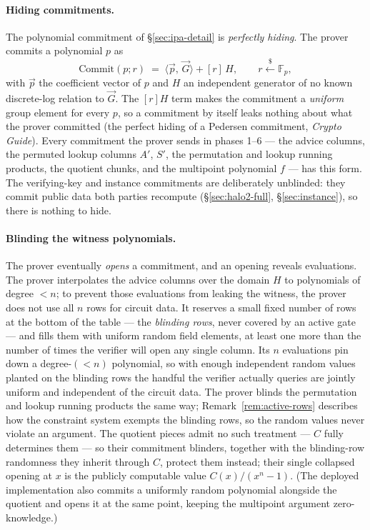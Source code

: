 \documentclass[11pt,a4paper]{article}
\theoremstyle{definition}
\newcommand{\F}{\mathbb{F}}
\newcommand{\ip}[2]{\langle #1,\, #2 \rangle}
\begin{document}
\paragraph{Hiding commitments.} The polynomial commitment of
\S\ref{sec:ipa-detail} is \emph{perfectly hiding}. The prover commits a polynomial \(p\)
as
\[
  \mathrm{Commit}(p; r) \;=\; \ip{\vec{p}}{\vec{G}} + [r]\,H, \qquad
  r \stackrel{\$}{\leftarrow} \F_p,
\]
with \(\vec p\) the coefficient vector of \(p\) and \(H\) an independent generator
of no known discrete-log relation to \(\vec G\). The \([r]H\) term makes the
commitment a \emph{uniform} group element for every \(p\), so a commitment by
itself leaks nothing about what the prover committed (the perfect hiding of a Pedersen
commitment, \emph{Crypto Guide}). Every commitment the prover sends in
phases 1--6 --- the advice columns, the permuted lookup columns $A'$, $S'$,
the permutation and lookup running products, the quotient chunks, and the
multipoint polynomial $f$ --- has this form. The verifying-key and instance
commitments are deliberately unblinded: they commit public data both parties
recompute (\S\ref{sec:halo2-full}, \S\ref{sec:instance}), so there is
nothing to hide.

\paragraph{Blinding the witness polynomials.} The prover eventually
\emph{opens} a commitment, and an opening reveals evaluations. The prover interpolates the advice columns
over the domain \(H\) to polynomials of degree \(< n\); to prevent those
evaluations from leaking the witness, the prover does not use all \(n\) rows for
circuit data. It reserves a small fixed number of rows at the bottom of the table
--- the \emph{blinding rows}, never covered by an active gate --- and fills them
with uniform random field elements, at least one more than the number of times the
verifier will open any single column. Its \(n\) evaluations pin down a degree-\((<n)\) polynomial,
so with enough independent random values planted on the
blinding rows the handful the verifier actually queries are jointly uniform and
independent of the circuit data. The prover blinds the permutation and lookup running products the same
way; Remark~\ref{rem:active-rows} describes how the constraint system
exempts the blinding rows, so the random values never violate an
argument. The quotient pieces admit no such treatment --- $C$ fully
determines them --- so their commitment blinders, together with the
blinding-row randomness they inherit through $C$, protect them instead;
their single collapsed opening at $x$ is the publicly computable value
$C(x)/(x^n - 1)$. (The deployed implementation also commits a uniformly
random polynomial alongside the quotient and opens it at the same point,
keeping the multipoint argument zero-knowledge.)
\end{document}
